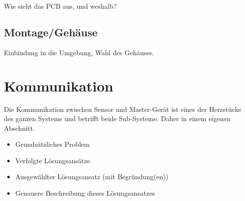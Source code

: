 Wie sieht das PCB aus, und weshalb?

\subsection{Montage/Geh\"ause}
\label{subsec:mastergerat:pcb}

Einbindung in die Umgebung, Wahl des Geh\"auses.


\section{Kommunikation}
\label{sec:kommunikation}

Die   Kommunikation  zwischen   Sensor  und   Master-Ger\"at  ist   eines  der
Herzst\"ucke des ganzen Systems und betrifft beide Sub-Systeme. Daher in einem
eigenen Abschnitt.

\begin{itemize}
    \item
        Grunds\"atzliches Problem
    \item
        Verfolgte L\"osungsans\"atze
    \item
        Ausgew\"ahlter L\"osungsansatz (mit Begr\"undung(en))
    \item
        Genauere Beschreibung dieses L\"osungsansatzes
\end{itemize}
